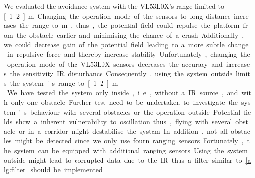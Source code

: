 We evaluated the avoidance system with the VL53L0X's range limited to \unit[1.2]{m}. Changing the operation mode of the sensors to long distance increases the range to \unit[2]{m}, thus, the potential field could repulse the platform from the obstacle earlier and minimising the chance of a crash. Additionally, we could decrease gain of the potential field leading to a more subtle change in repulsive force and thereby increase stability. Unfortunately, changing the operation mode of the VL53L0X sensors decreases the accuracy and increases the sensitivity IR disturbance. Consequently, using the system outside limits the system's range to \unit[1.2]{m}.\\
We have tested the system only inside, i.e., without a IR source, and with only one obstacle. Further test need to be undertaken to investigate the system's behaviour with several obstacles or the operation outside. Potential fields show a inherent vulnerability to oscillation thus, flying with several obstacle or in a corridor might destabilise the system. In addition, not all obstacles might be detected since we only use fourn ranging sensors. Fortunately, the system can be equipped with additional ranging sensors. Using the system outside might lead to corrupted data due to the IR thus a filter similar to \cref{alg:filter} should be implemented.\\
